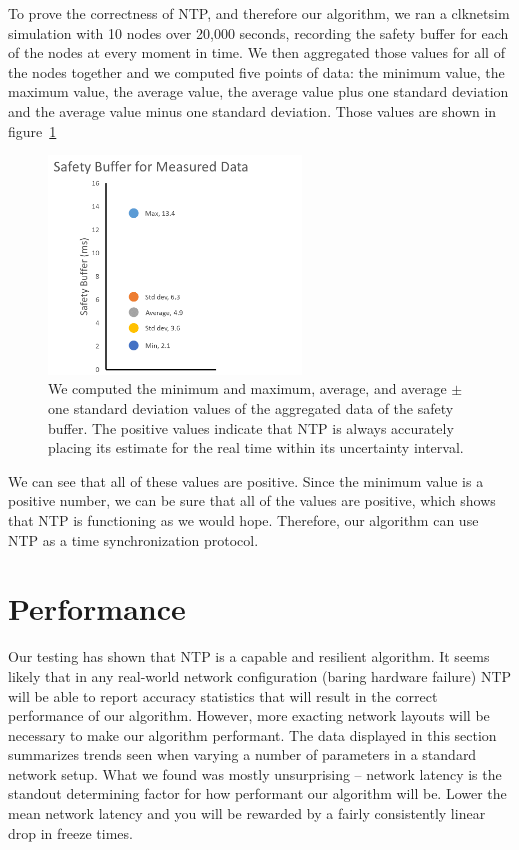 To prove the correctness of NTP, and therefore our algorithm, we ran a
clknetsim simulation with 10 nodes over 20,000 seconds, 
recording the safety buffer for each of the nodes at
every moment in time. We then aggregated those values for all of the
nodes together and we computed five points of data: the minimum value,
the maximum value, the average value, the average value plus one
standard deviation and the average value minus one standard
deviation. Those values are shown in figure~\ref{fig:safety-data}

\begin{figure}[h]
  \caption{We computed the minimum and maximum, average, and average $\pm$ one standard deviation values of the aggregated data of the safety buffer. The positive values indicate that NTP is always accurately placing its estimate for the real time within its uncertainty interval.}
  \label{fig:safety-data}
  \centering
  \includegraphics[width=0.6\textwidth]{5pointsSafety.png}
\end{figure}

We can see that all of these values are positive. Since the minimum
value is a positive number, we can be sure that all of the values are
positive, which shows that NTP is functioning as we would
hope. Therefore, our algorithm can use NTP as a time synchronization
protocol.

\section{Performance}

Our testing has shown that NTP is a capable and resilient
algorithm. It seems likely that in any real-world network
configuration (baring hardware failure) NTP will be able to report
accuracy statistics that will result in the correct performance of our
algorithm. However, more exacting network layouts will be necessary to
make our algorithm performant. The data displayed in this section
summarizes trends seen when varying a number of parameters in a
standard network setup. What we found was mostly unsurprising --
network latency is the standout determining factor for how performant
our algorithm will be. Lower the mean network latency and you will be
rewarded by a fairly consistently linear drop in freeze times.

